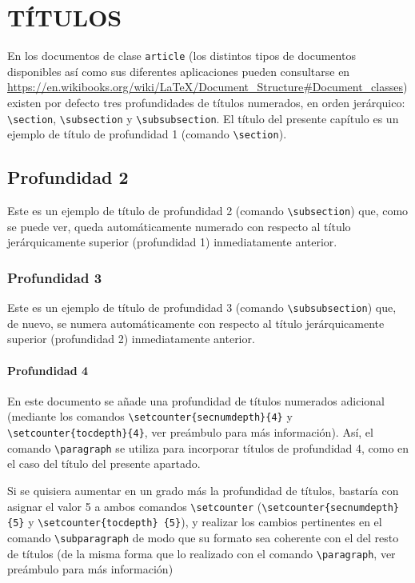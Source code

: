 \documentclass[a4paper, 11pt, spanish, twoside]{article}
\begin{document}

\section{TÍTULOS} \label{sec:titulos}

En los documentos de clase \texttt{article} (los distintos tipos de documentos disponibles así como sus diferentes aplicaciones pueden consultarse en \url{https://en.wikibooks.org/wiki/LaTeX/Document_Structure#Document_classes}) existen por defecto tres profundidades de títulos numerados, en orden jerárquico: \texttt{\textbackslash section}, \texttt{\textbackslash subsection} y \texttt{\textbackslash subsubsection}. El título del presente capítulo es un ejemplo de título de profundidad 1 (comando \texttt{\textbackslash section}).


\subsection{Profundidad 2}

Este es un ejemplo de título de profundidad 2 (comando \texttt{\textbackslash subsection}) que, como se puede ver, queda automáticamente numerado con respecto al título jerárquicamente superior (profundidad 1) inmediatamente anterior.


\subsubsection{Profundidad 3}

Este es un ejemplo de título de profundidad 3 (comando \texttt{\textbackslash subsubsection}) que, de nuevo, se numera automáticamente con respecto al título jerárquicamente superior (profundidad 2) inmediatamente anterior.


\paragraph{Profundidad 4}

En este documento se añade una profundidad de títulos numerados adicional (mediante los comandos \texttt{\textbackslash setcounter\{secnumdepth\}\{4\}} y \texttt{\textbackslash setcounter\{tocdepth\}\{4\}}, ver preámbulo para más información). Así, el comando \texttt{\textbackslash paragraph} se utiliza para incorporar títulos de profundidad 4, como en el caso del título del presente apartado. 

Si se quisiera aumentar en un grado más la profundidad de títulos, bastaría con asignar el valor 5 a ambos comandos \texttt{\textbackslash setcounter} (\texttt{\textbackslash setcounter\{secnumdepth\}\{5\}} y \texttt{\textbackslash setcounter\{tocdepth\} \{5\}}), y realizar los cambios pertinentes en el comando \texttt{\textbackslash subparagraph} de modo que su formato sea coherente con el del resto de títulos (de la misma forma que lo realizado con el comando \texttt{\textbackslash paragraph}, ver preámbulo para más información)
\end{document}
